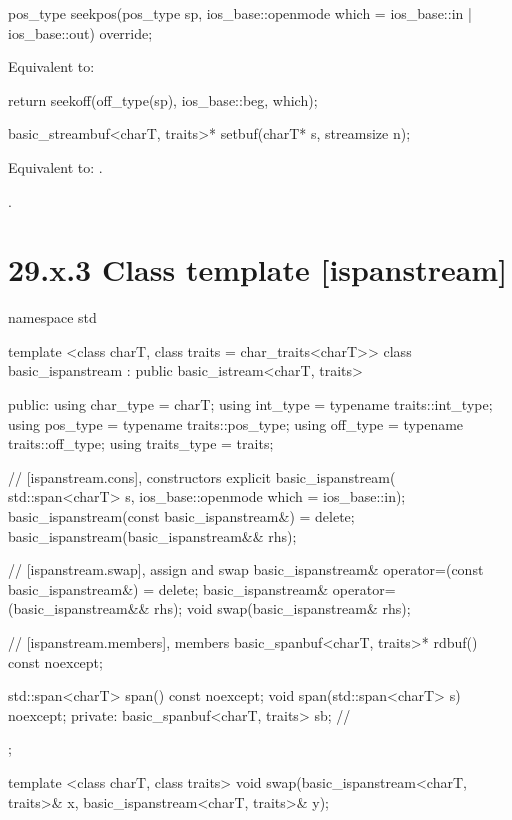 \documentclass[ebook,11pt,article]{memoir}
\renewcommand{\iref}[1]{[#1]}
\begin{document}
\begin{itemdecl}
pos_type seekpos(pos_type sp,
                 ios_base::openmode which
                   = ios_base::in | ios_base::out) override;
\end{itemdecl}

\begin{itemdescr}
\pnum
\effects
Equivalent to: 
\begin{codeblock}
return seekoff(off_type(sp), ios_base::beg, which);
\end{codeblock}
\end{itemdescr}

\begin{itemdecl}
basic_streambuf<charT, traits>* setbuf(charT* s, streamsize n);
\end{itemdecl}

\begin{itemdescr}
\pnum
\effects
Equivalent to:
.

\pnum
\returns
{}.
\end{itemdescr} 

\section{29.x.3 Class template  [ispanstream] }

\begin{codeblock}
namespace std {
  template <class charT, class traits = char_traits<charT>>
  class basic_ispanstream
    : public basic_istream<charT, traits> {
  public:
    using char_type      = charT;
    using int_type       = typename traits::int_type;
    using pos_type       = typename traits::pos_type;
    using off_type       = typename traits::off_type;
    using traits_type    = traits;

    // \iref{ispanstream.cons}, constructors
    explicit basic_ispanstream(
      std::span<charT> s,
      ios_base::openmode which = ios_base::in);
    basic_ispanstream(const basic_ispanstream&) = delete;
    basic_ispanstream(basic_ispanstream&& rhs);

    // \iref{ispanstream.swap}, assign and swap
    basic_ispanstream& operator=(const basic_ispanstream&) = delete;
    basic_ispanstream& operator=(basic_ispanstream&& rhs);
    void swap(basic_ispanstream& rhs);

    // \iref{ispanstream.members}, members
    basic_spanbuf<charT, traits>* rdbuf() const noexcept;

    std::span<charT> span() const noexcept;
    void span(std::span<charT> s) noexcept;
  private:
    basic_spanbuf<charT, traits> sb; // \expos
  };

  template <class charT, class traits>
    void swap(basic_ispanstream<charT, traits>& x,
              basic_ispanstream<charT, traits>& y);
}
\end{codeblock}
\end{document}
